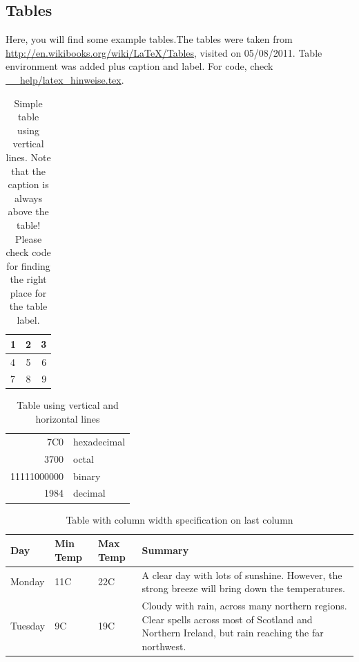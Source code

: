 \newpage
\subsection*{Tables}
Here, you will find some example tables.The tables were taken from \url{http://en.wikibooks.org/wiki/LaTeX/Tables}, visited on 05/08/2011. Table environment was added plus caption and label. For code, check \url{__help/latex_hinweise.tex}.

\begin{table}[h]
\caption{Simple table using vertical lines. Note that the caption is always above the table! Please check code for finding the right place for the table label.\label{tab:help1}}
\centering
  \begin{tabular}{ l | c || r | }
    \hline
    1 & 2 & 3 \\ \hline
    4 & 5 & 6 \\ \hline
    7 & 8 & 9 \\
    \hline
  \end{tabular}
\end{table}

\begin{table}[h]
\caption{Table using vertical and horizontal lines\label{tab:help2}}
\centering
\begin{tabular}{|r|l|}
  \hline
  7C0 & hexadecimal \\
  3700 & octal \\ \cline{2-2}
  11111000000 & binary \\
  \hline \hline
  1984 & decimal \\
  \hline
\end{tabular}
\end{table}

\begin{table}[h]
\caption{Table with column width specification on last column\label{tab:help3}}
\centering
    \begin{tabular}{ | l | l | l | p{5cm} |}
    \hline
    Day & Min Temp & Max Temp & Summary \\ \hline
    Monday & 11C & 22C & A clear day with lots of sunshine.  
    However, the strong breeze will bring down the temperatures. \\ \hline
    Tuesday & 9C & 19C & Cloudy with rain, across many northern regions. Clear spells
    across most of Scotland and Northern Ireland,
    but rain reaching the far northwest. \\
    \hline
    \end{tabular}
\end{table}

